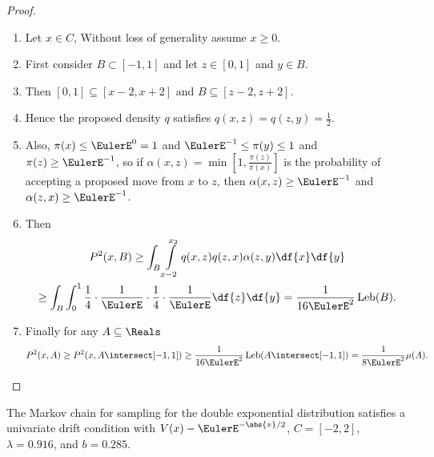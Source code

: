 \documentclass[12pt]{article}
\begin{document}
\begin{example}
    \begin{proof}
        \begin{enumerate}
            \item
                Let \( x \in C \), Without loss of generality assume \(
                x \ge 0 \).
            \item
                First consider \( B \subset [-1,1] \) and let \( z \in [0,1]
                \) and \( y \in B \).
            \item
                Then \( [0,1] \subseteq [x-2, x+2] \) and \( B \subseteq
                [z-2, z+2] \).
            \item
                Hence the proposed density \( q \) satisfies \( q(x,z) =
                q(z, y) = \frac{1}{2} \).
            \item
                Also, \( \pi(x) \le \EulerE^0 = 1 \) and \( \EulerE^{-1}
                \le \pi(y) \le 1 \) and \( \pi(z) \ge \EulerE^{-1} \),
                so if \( \alpha(x,z) = \min[1, \frac{\pi(z)}{\pi(x)}] \)
                is the probability of accepting a proposed move from \(
                x \) to \( z \), then \( \alpha(x,z) \ge \EulerE^{-1} \)
                and \( \alpha(z,x) \ge \EulerE^{-1} \).
            \item
                Then
                \begin{multline*}
                    P^2(x,B) \ge \int_B \int\limits_{x-2}^{x_2} q(x,z) q
                    (z,x) \alpha(z,y) \df{x} \df{y} \\
                    \ge \int_B \int_0^1 \frac{1}{4} \cdot \frac{1}{\EulerE}
                    \cdot \frac{1}{4} \cdot \frac{1}{\EulerE} \df{z} \df
                    {y} = \frac{1}{16 \EulerE^2}
                    \operatorname{Leb}
                    (B).
                \end{multline*}
            \item
                Finally for any \( A \subseteq \Reals \)
                \[
                    P^2(x,A) \ge P^2(x,A \intersect [-1,1]) \ge \frac{1}
                    {16 \EulerE^2}
                    \operatorname{Leb}
                    (A \intersect [-1,1]) = \frac{1}{8 \EulerE^2} \mu(A).
                \]
        \end{enumerate}
    \end{proof}

    \begin{lemma}
        The Markov chain for sampling for the double exponential
        distribution satisfies a univariate drift condition with \( V(x)
        - \EulerE^{-\abs{x}/2} \), \( C = [-2,2] \), \( \lambda = 0.916 \),
        and \( b = 0.285 \).
    \end{lemma}


\end{example}
\end{document}
